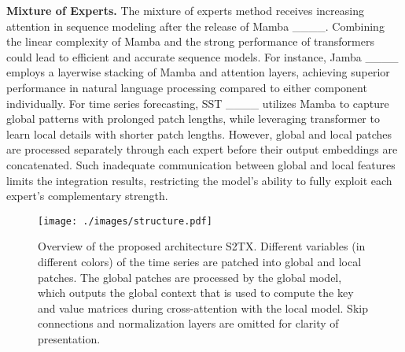 \textbf{Mixture of Experts.}
The mixture of experts method receives increasing attention in sequence modeling after the release of Mamba ____. Combining the linear complexity of Mamba and the strong performance of transformers could lead to efficient and accurate sequence models. For instance, Jamba ____ employs a layerwise stacking of Mamba and attention layers, achieving superior performance in natural language processing compared to either component individually. For time series forecasting, SST ____ utilizes Mamba to capture global patterns with prolonged patch lengths, while leveraging transformer to learn local details with shorter patch lengths. However, global and local patches are processed separately through each expert before their output embeddings are concatenated. Such inadequate communication between global and local features limits the integration results, restricting the model's ability to fully exploit each expert's complementary strength. 

\begin{figure*}[t]
    \centering
    \texttt{[image: ./images/structure.pdf]} %
    \caption{Overview of the proposed architecture S2TX. Different variables (in different colors) of the time series are patched into global and local patches. The global patches are processed by the global model, which outputs the global context that is used to compute the key and value matrices during cross-attention with the local model. Skip connections and normalization layers are omitted for clarity of presentation.}
    \label{fig:structure}
\end{figure*}
